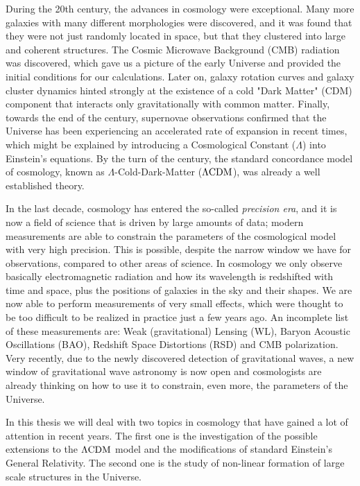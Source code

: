 During the 20th century, the advances in cosmology were exceptional. Many more galaxies with many different morphologies were discovered,
and it was found that they were not just randomly located in space, but that they clustered into large and coherent structures. The Cosmic Microwave Background (CMB) radiation was discovered, which gave us a picture of the early Universe and provided the initial conditions for our calculations. 
Later on, galaxy rotation curves and galaxy cluster dynamics hinted strongly at the existence of a cold "Dark Matter" (CDM) component that interacts only gravitationally with common matter.
Finally, towards the end of the century, supernovae observations confirmed that the Universe 
has been experiencing an accelerated rate of expansion in recent times, which might be explained
by introducing a Cosmological Constant ($\Lambda$) into Einstein's equations. 
By the turn of the century, the standard concordance
model of cosmology, known as $\Lambda$-Cold-Dark-Matter ($\Lambda\mathrm{CDM}$), was already a well established theory.

In the last decade, cosmology has entered the so-called \emph{precision era}, and it is now a field of science that is driven by large amounts of data; modern measurements are able to constrain the parameters of the cosmological model with very high precision. 
This is possible, despite the narrow window we have for 
observations, compared to other areas of science. In cosmology we only observe basically electromagnetic radiation 
and how its wavelength is redshifted with time and space, plus the positions of galaxies
in the sky and their shapes.
We are now able to perform measurements of very small effects, which
were thought to be too difficult to be realized in practice just a few years ago. An incomplete list of these measurements 
are: Weak (gravitational) Lensing (WL), Baryon Acoustic Oscillations (BAO), Redshift Space Distortions (RSD) and CMB polarization.
Very recently, due to the newly discovered detection of gravitational waves, a new window of gravitational wave astronomy is now open and cosmologists are already thinking on how to use it to constrain, even more, the parameters of the Universe.

In this thesis we will deal with two topics in cosmology that have gained a lot of attention in recent years. The first one is the investigation of the possible extensions to the $\Lambda\mathrm{CDM}$ model and the modifications of standard Einstein's General Relativity. The second one is the study of non-linear
formation of large scale structures in the Universe.

